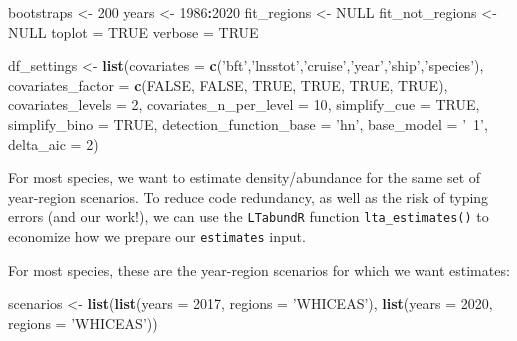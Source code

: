 \documentclass[
]{book}
\newenvironment{Shaded}{\begin{snugshade}}{\end{snugshade}}
\newcommand{\DataTypeTok}[1]{\textcolor[rgb]{0.13,0.29,0.53}{#1}}
\newcommand{\DecValTok}[1]{\textcolor[rgb]{0.00,0.00,0.81}{#1}}
\newcommand{\KeywordTok}[1]{\textcolor[rgb]{0.13,0.29,0.53}{\textbf{#1}}}
\newcommand{\NormalTok}[1]{#1}
\newcommand{\OperatorTok}[1]{\textcolor[rgb]{0.81,0.36,0.00}{\textbf{#1}}}
\newcommand{\OtherTok}[1]{\textcolor[rgb]{0.56,0.35,0.01}{#1}}
\newcommand{\StringTok}[1]{\textcolor[rgb]{0.31,0.60,0.02}{#1}}
\begin{document}
\begin{Shaded}
\begin{Highlighting}[]
\NormalTok{bootstraps <-}\StringTok{ }\DecValTok{200}
\NormalTok{years <-}\StringTok{ }\DecValTok{1986}\OperatorTok{:}\DecValTok{2020}
\NormalTok{fit_regions <-}\StringTok{ }\OtherTok{NULL}
\NormalTok{fit_not_regions <-}\StringTok{ }\OtherTok{NULL}
\NormalTok{toplot =}\StringTok{ }\OtherTok{TRUE}
\NormalTok{verbose =}\StringTok{ }\OtherTok{TRUE}

\NormalTok{df_settings <-}
\StringTok{  }\KeywordTok{list}\NormalTok{(}\DataTypeTok{covariates =} \KeywordTok{c}\NormalTok{(}\StringTok{'bft'}\NormalTok{,}\StringTok{'lnsstot'}\NormalTok{,}\StringTok{'cruise'}\NormalTok{,}\StringTok{'year'}\NormalTok{,}\StringTok{'ship'}\NormalTok{,}\StringTok{'species'}\NormalTok{),}
       \DataTypeTok{covariates_factor =} \KeywordTok{c}\NormalTok{(}\OtherTok{FALSE}\NormalTok{, }\OtherTok{FALSE}\NormalTok{, }\OtherTok{TRUE}\NormalTok{, }\OtherTok{TRUE}\NormalTok{, }\OtherTok{TRUE}\NormalTok{, }\OtherTok{TRUE}\NormalTok{),}
       \DataTypeTok{covariates_levels =} \DecValTok{2}\NormalTok{,}
       \DataTypeTok{covariates_n_per_level =} \DecValTok{10}\NormalTok{,}
       \DataTypeTok{simplify_cue =} \OtherTok{TRUE}\NormalTok{,}
       \DataTypeTok{simplify_bino =} \OtherTok{TRUE}\NormalTok{,}
       \DataTypeTok{detection_function_base =} \StringTok{'hn'}\NormalTok{,}
       \DataTypeTok{base_model =} \StringTok{'~1'}\NormalTok{,}
       \DataTypeTok{delta_aic =} \DecValTok{2}\NormalTok{)}
\end{Highlighting}
\end{Shaded}

For most species, we want to estimate density/abundance for the same set of year-region scenarios. To reduce code redundancy, as well as the risk of typing errors (and our work!), we can use the \texttt{LTabundR} function \texttt{lta\_estimates()} to economize how we prepare our \texttt{estimates} input.

For most species, these are the year-region scenarios for which we want estimates:

\begin{Shaded}
\begin{Highlighting}[]
\NormalTok{scenarios <-}\StringTok{ }\KeywordTok{list}\NormalTok{(}\KeywordTok{list}\NormalTok{(}\DataTypeTok{years =} \DecValTok{2017}\NormalTok{,}
                       \DataTypeTok{regions =} \StringTok{'WHICEAS'}\NormalTok{),}
                  \KeywordTok{list}\NormalTok{(}\DataTypeTok{years =} \DecValTok{2020}\NormalTok{, }
                       \DataTypeTok{regions =} \StringTok{'WHICEAS'}\NormalTok{))}
\end{Highlighting}
\end{Shaded}
\end{document}
